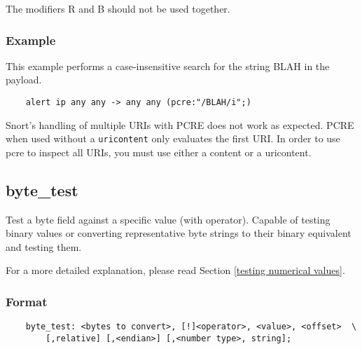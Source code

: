 \documentclass[english]{report}
\newenvironment{note}{
\samepage
    \vspace{10pt}{\textsf{
        {\hspace{7pt}\Huge{$\triangle$\hspace{-12.5pt}{\Large{$^!$}}}}\hspace{5pt}
        {\Large{NOTE}}
    }
    }
   \begin{center}
    \par\vspace{-17pt}

    \begin{lrbox}{\savepar}
    \begin{minipage}[r]{6in}
}
{
    \end{minipage}
    \end{lrbox}
    \fbox{
        \usebox{
            \savepar
	}
    }
    \par\vskip10pt
    \end{center}
}
\newenvironment{note}{
        \begin{rawhtml}
        <p><table border="1"><tr><td><b>
        Note:&nbsp;&nbsp;</b>
        \end{rawhtml}
}{
        \begin{rawhtml}
        </b></td></tr></table></p>
        \end{rawhtml}
}
\begin{document}
\begin{note}
The modifiers R and B should not be used together.
\end{note}

\subsubsection{Example}

This example performs a case-insensitive search for the string BLAH in the payload.

\begin{verbatim}
    alert ip any any -> any any (pcre:"/BLAH/i";)
\end{verbatim}

\begin{note}

Snort's handling of multiple URIs with PCRE does not work as expected.  PCRE
when used without a \texttt{uricontent} only evaluates the first URI.  In order
to use pcre to inspect all URIs, you must use either a content or a uricontent.

\end{note}

\subsection{byte\_test}
\label{sub:byte_test}

Test a byte field against a specific value (with operator).  Capable of testing
binary values or converting representative byte strings to their binary
equivalent and testing them.

For a more detailed explanation, please read Section \ref{testing numerical
values}.

\subsubsection{Format}

\begin{verbatim}
    byte_test: <bytes to convert>, [!]<operator>, <value>, <offset>  \
        [,relative] [,<endian>] [,<number type>, string];
\end{verbatim}
\end{document}
